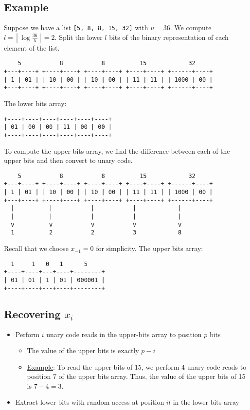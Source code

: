 \documentclass[10pt]{article}
\begin{document}
\subsection{Example}\label{example}
Suppose we have a list \texttt{[5, 8, 8, 15, 32]} with \(u= 36\).
We compute \(l = \left \lfloor \log{\frac{36}{5}} \right \rfloor = 2 \).
Split the lower \(l\) bits of the binary representation of each element of the list.
\begin{verbatim}
    5           8           8          15            32
+---+----+ +----+----+ +----+----+ +----+----+ +------+----+
| 1 | 01 | | 10 | 00 | | 10 | 00 | | 11 | 11 | | 1000 | 00 |
+---+----+ +----+----+ +----+----+ +----+----+ +------+----+
\end{verbatim}
The lower bits array:
\begin{verbatim}
+----+----+----+----+----+----+
| 01 | 00 | 00 | 11 | 00 | 00 |
+----+----+----+----+----+----+
\end{verbatim}
To compute the upper bits array, we find the difference between each of the upper bits
and then convert to unary code.
\begin{verbatim}
    5           8           8          15            32
+---+----+ +----+----+ +----+----+ +----+----+ +------+----+
| 1 | 01 | | 10 | 00 | | 10 | 00 | | 11 | 11 | | 1000 | 00 |
+---+----+ +----+----+ +----+----+ +----+----+ +------+----+
  |          |           |           |            |
  |          |           |           |            |
  v          v           v           v            v
  1          2           2           3            8
\end{verbatim}
Recall that we choose \(x_{-1} = 0\) for simplicity.
The upper bits array:
\begin{verbatim}
  1     1   0   1      5
+----+----+---+----+--------+
| 01 | 01 | 1 | 01 | 000001 |
+----+----+---+----+--------+
\end{verbatim}

\subsection{Recovering \(x_i\)}\label{recovering-xi}
\begin{itemize}
\item
    Perform \(i\) unary code reads in the upper-bits array to position \(p\) bits
    \begin{itemize}
    \item
        The value of the upper bits is exactly \(p - i\)
    \item
        \underline{Example}: To read the upper bits of 15, we perform 4 unary code reads to 
        position 7 of the upper bits array.
        Thus, the value of the upper bits of 15 is \(7 - 4 = 3\).
    \end{itemize}
\item
    Extract lower bits with random access at position \(il\) in the lower bits array
\end{itemize}
\end{document}

